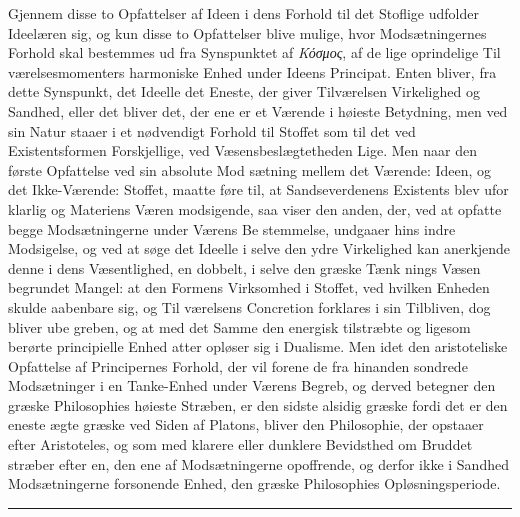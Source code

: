\documentclass[12pt,a4paper]{book}
\newcommand{\divrule}{\begin{center}\rule{2cm}{0.4pt}\end{center}}
\newcommand{\gk}[1]{\textit{#1}}
\begin{document}
Gjennem disse to Opfattelser af Ideen i dens Forhold til
det Stoflige udfolder Ideelæren sig, og kun disse to Opfattelser
blive mulige, hvor Modsætningernes Forhold skal bestemmes
ud fra Synspunktet af \gk{Κόσμος}, af de lige oprindelige Til\-%
værelsesmomenters harmoniske Enhed under Ideens Principat.
Enten bliver, fra dette Synspunkt, det Ideelle det Eneste, der
giver Tilværelsen Virkelighed og Sandhed, eller det bliver det,
der ene er et Værende i høieste Betydning, men ved sin
Natur staaer i et nødvendigt Forhold til Stoffet som til det
ved Existentsformen Forskjellige, ved Væsensbeslægtetheden
Lige. Men naar den første Opfattelse ved sin absolute Mod\-%
sætning mellem det Værende: Ideen, og det Ikke-Værende:
Stoffet, maatte føre til, at Sandseverdenens Existents blev ufor\-%
klarlig og Materiens Væren modsigende, saa viser den anden,
der, ved at opfatte begge Modsætningerne under Værens Be\-%
stemmelse, undgaaer hins indre Modsigelse, og ved at søge
det Ideelle i selve den ydre Virkelighed kan anerkjende denne
i dens Væsentlighed, en dobbelt, i selve den græske Tænk\-%
nings Væsen begrundet Mangel: at den Formens Virksomhed
i Stoffet, ved hvilken Enheden skulde aabenbare sig, og Til\-%
værelsens Concretion forklares i sin Tilbliven, dog bliver ube\-%
greben, og at med det Samme den energisk tilstræbte og
ligesom berørte principielle Enhed atter opløser sig i Dualisme.
Men idet den aristoteliske Opfattelse af Principernes Forhold,
der vil forene de fra hinanden sondrede Modsætninger i en
Tanke-Enhed under Værens Begreb, og derved betegner den
græske Philosophies høieste Stræben, er den sidste alsidig
græske fordi det er den eneste ægte græske ved Siden af
Platons, bliver den Philosophie, der opstaaer efter Aristoteles,
og som med klarere eller dunklere Bevidsthed om Bruddet
stræber efter en, den ene af Modsætningerne opoffrende, og
derfor ikke i Sandhed Modsætningerne forsonende Enhed, den
græske Philosophies Opløsningsperiode.
\divrule
\end{document}
